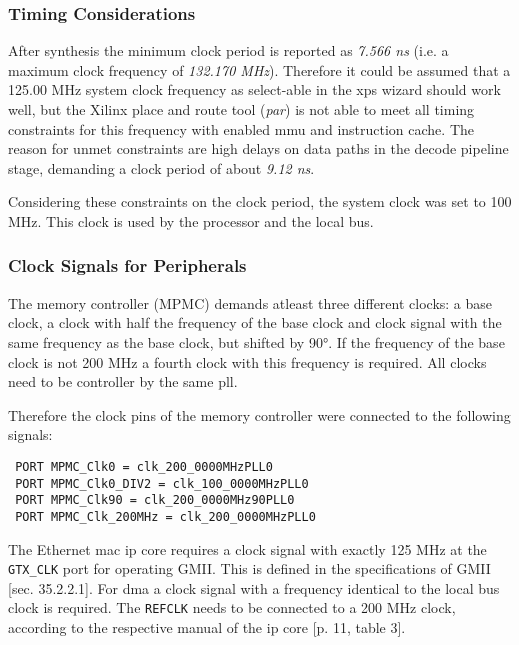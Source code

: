 \subsubsection{Timing Considerations}

After synthesis the minimum clock period is reported as \textit{7.566 ns} (i.e. a maximum clock frequency of \textit{132.170 MHz}). Therefore it could be assumed that a 125.00 MHz system clock frequency as select-able in the \gls{xps} wizard should work well, but the Xilinx place and route tool (\textit{par}) is not able to meet all timing constraints for this frequency with enabled \gls{mmu} and instruction cache. The reason for unmet constraints are high delays on data paths in the decode pipeline stage, demanding a clock period of about \textit{9.12 ns}.

Considering these constraints on the clock period, the system clock was set to 100 MHz. This clock is used by the processor and the local bus.

\subsubsection{Clock Signals for Peripherals}

The memory controller (MPMC) demands atleast three different clocks: a base clock, a clock with half the frequency of the base clock and clock signal with the same frequency as the base clock, but shifted by 90°. If the frequency of the base clock is not 200 MHz a fourth clock with this frequency is required. All clocks need to be controller by the same \gls{pll}.

Therefore the clock pins of the memory controller were connected to the following signals:

\begin{verbatim}
 PORT MPMC_Clk0 = clk_200_0000MHzPLL0
 PORT MPMC_Clk0_DIV2 = clk_100_0000MHzPLL0
 PORT MPMC_Clk90 = clk_200_0000MHz90PLL0
 PORT MPMC_Clk_200MHz = clk_200_0000MHzPLL0
\end{verbatim}

The Ethernet \gls{mac} \gls{ip} core requires a clock signal with exactly 125 MHz at the \texttt{GTX\_CLK} port for operating GMII. This is defined in the specifications of GMII \cite{ieee802_3}[sec. 35.2.2.1]. For \gls{dma} a clock signal with a frequency identical to the local bus clock is required. The \texttt{REFCLK} needs to be connected to a 200 MHz clock, according to the respective manual of the \gls{ip} core \cite{xps_ll_temac}[p. 11, table 3].

